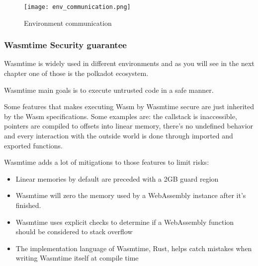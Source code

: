 \documentclass[../main.tex]{subfiles}
\begin{document}
\begin{figure}[h]
  \centering
  \texttt{[image: env\_communication.png]}
  \caption{Environment communication}
  \label{fig:env-communication}
\end{figure}

\subsubsection{Wasmtime Security guarantee}

Wasmtime is widely used in different environments and as you will see in the next chapter one of those is the polkadot ecosystem.

Wasmtime main goals is to execute untrusted code in a safe manner.~\cite{wasmtime-book}

Some features that makes executing Wasm by Wasmtime secure are just inherited by the Wasm specifications. Some examples are: the callstack is inaccessible, pointers are compiled to offsets into linear memory, there's no undefined behavior and every interaction with the outside world is done through imported and exported functions.~\cite{wasmtime-book}

Wasmtime adds  a lot of mitigations to those features to limit risks:
\begin{itemize}
  \item Linear memories by default are preceded with a 2GB guard region
  \item Wasmtime will zero the memory used by a WebAssembly instance after it's finished.
  \item Wasmtime uses explicit checks to determine if a WebAssembly function should be considered to stack overflow
  \item The implementation language of Wasmtime, Rust, helps catch mistakes when writing Wasmtime itself at compile time
\end{itemize}
\end{document}
